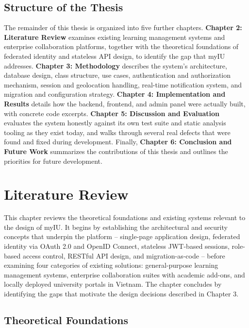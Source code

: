 \documentclass[12pt,a4paper]{report}
\begin{document}
\section{Structure of the Thesis}

The remainder of this thesis is organized into five further chapters.
\textbf{Chapter 2: Literature Review} examines existing learning
management systems and enterprise collaboration platforms, together
with the theoretical foundations of federated identity and stateless
API design, to identify the gap that myIU addresses. \textbf{Chapter 3:
Methodology} describes the system's architecture, database design,
class structure, use cases, authentication and authorization mechanism,
session and geolocation handling, real-time notification system, and
migration and configuration strategy. \textbf{Chapter 4: Implementation
and Results} details how the backend, frontend, and admin panel were
actually built, with concrete code excerpts. \textbf{Chapter 5:
Discussion and Evaluation} evaluates the system honestly against its own
test suite and static analysis tooling as they exist today, and walks
through several real defects that were found and fixed during
development. Finally, \textbf{Chapter 6: Conclusion and Future Work}
summarizes the contributions of this thesis and outlines the priorities
for future development.

\chapter{Literature Review}

This chapter reviews the theoretical foundations and existing systems
relevant to the design of myIU. It begins by establishing the
architectural and security concepts that underpin the platform --
single-page application design, federated identity via OAuth 2.0 and
OpenID Connect, stateless JWT-based sessions, role-based access control,
RESTful API design, and migration-as-code -- before examining four
categories of existing solutions: general-purpose learning management
systems, enterprise collaboration suites with academic add-ons, and
locally deployed university portals in Vietnam. The chapter concludes
by identifying the gaps that motivate the design decisions described in
Chapter 3.

\section{Theoretical Foundations}
\end{document}
